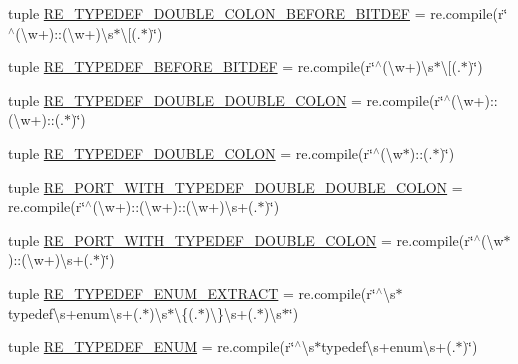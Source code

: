 \begin{DoxyCompactItemize}
\item 
tuple \hyperlink{namespacesrc_1_1regex_a7e136b3ec7a100ddc8d3a3a50a8af216}{R\-E\-\_\-\-T\-Y\-P\-E\-D\-E\-F\-\_\-\-D\-O\-U\-B\-L\-E\-\_\-\-C\-O\-L\-O\-N\-\_\-\-B\-E\-F\-O\-R\-E\-\_\-\-B\-I\-T\-D\-E\-F} = re.\-compile(r\char`\"{}$^\wedge$(\textbackslash{}w+)\-::(\textbackslash{}w+)\textbackslash{}s$\ast$\textbackslash{}\mbox{[}(.$\ast$)\char`\"{})
\item 
tuple \hyperlink{namespacesrc_1_1regex_ad52741e67988ade4fa748769d98bb9b5}{R\-E\-\_\-\-T\-Y\-P\-E\-D\-E\-F\-\_\-\-B\-E\-F\-O\-R\-E\-\_\-\-B\-I\-T\-D\-E\-F} = re.\-compile(r\char`\"{}$^\wedge$(\textbackslash{}w+)\textbackslash{}s$\ast$\textbackslash{}\mbox{[}(.$\ast$)\char`\"{})
\item 
tuple \hyperlink{namespacesrc_1_1regex_ab79ce804120083ee760214723349ed11}{R\-E\-\_\-\-T\-Y\-P\-E\-D\-E\-F\-\_\-\-D\-O\-U\-B\-L\-E\-\_\-\-D\-O\-U\-B\-L\-E\-\_\-\-C\-O\-L\-O\-N} = re.\-compile(r\char`\"{}$^\wedge$(\textbackslash{}w+)\-::(\textbackslash{}w+)\-::(.$\ast$)\char`\"{})
\item 
tuple \hyperlink{namespacesrc_1_1regex_a113c5e4cd181089c7ac1415b1fa67d38}{R\-E\-\_\-\-T\-Y\-P\-E\-D\-E\-F\-\_\-\-D\-O\-U\-B\-L\-E\-\_\-\-C\-O\-L\-O\-N} = re.\-compile(r\char`\"{}$^\wedge$(\textbackslash{}w$\ast$)\-::(.$\ast$)\char`\"{})
\item 
tuple \hyperlink{namespacesrc_1_1regex_ad93a8293149aaf420501efb6daba523f}{R\-E\-\_\-\-P\-O\-R\-T\-\_\-\-W\-I\-T\-H\-\_\-\-T\-Y\-P\-E\-D\-E\-F\-\_\-\-D\-O\-U\-B\-L\-E\-\_\-\-D\-O\-U\-B\-L\-E\-\_\-\-C\-O\-L\-O\-N} = re.\-compile(r\char`\"{}$^\wedge$(\textbackslash{}w+)\-::(\textbackslash{}w+)\-::(\textbackslash{}w+)\textbackslash{}s+(.$\ast$)\char`\"{})
\item 
tuple \hyperlink{namespacesrc_1_1regex_aa5afec46e0c6943277e3888ba7e38511}{R\-E\-\_\-\-P\-O\-R\-T\-\_\-\-W\-I\-T\-H\-\_\-\-T\-Y\-P\-E\-D\-E\-F\-\_\-\-D\-O\-U\-B\-L\-E\-\_\-\-C\-O\-L\-O\-N} = re.\-compile(r\char`\"{}$^\wedge$(\textbackslash{}w$\ast$)\-::(\textbackslash{}w+)\textbackslash{}s+(.$\ast$)\char`\"{})
\item 
tuple \hyperlink{namespacesrc_1_1regex_aae8c1f2567933a0d6a12bdc2ab505baf}{R\-E\-\_\-\-T\-Y\-P\-E\-D\-E\-F\-\_\-\-E\-N\-U\-M\-\_\-\-E\-X\-T\-R\-A\-C\-T} = re.\-compile(r\char`\"{}$^\wedge$\textbackslash{}s$\ast$typedef\textbackslash{}s+enum\textbackslash{}s+(.$\ast$)\textbackslash{}s$\ast$\textbackslash{}\{(.$\ast$)\textbackslash{}\}\textbackslash{}s+(.$\ast$)\textbackslash{}s$\ast$\char`\"{})
\item 
tuple \hyperlink{namespacesrc_1_1regex_a00196e0e53675c02e259668b26109c8f}{R\-E\-\_\-\-T\-Y\-P\-E\-D\-E\-F\-\_\-\-E\-N\-U\-M} = re.\-compile(r\char`\"{}$^\wedge$\textbackslash{}s$\ast$typedef\textbackslash{}s+enum\textbackslash{}s+(.$\ast$)\char`\"{})

\end{DoxyCompactItemize}

